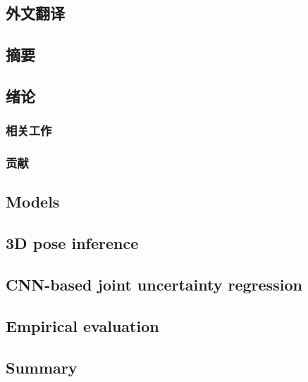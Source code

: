 \cleardoublepage
\begin{refsection}

\chapter{外文翻译}

\section*{摘要}


\section{绪论}


\subsection{相关工作}


\subsection{贡献}


\section{Models}


\section{3D pose inference}


\section{CNN-based joint uncertainty regression}\label{sec:cnn}


\section{Empirical evaluation}


\section{Summary}


\printbibliography[title={参考文献}]
% 
 
\end{refsection}

